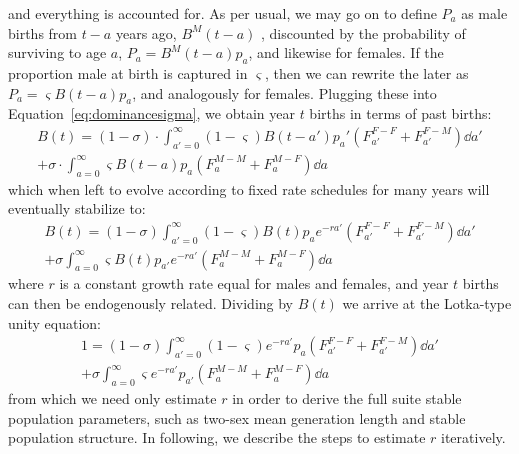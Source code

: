 and everything is accounted for. As per usual, we may go on to define $P_a$ as
male births from $t-a$ years ago, $B^M(t-a)$ , discounted by the probability of
surviving to age $a$, $P_a = B^M(t-a)p_a$, and likewise for females. If the
proportion male at birth is captured in $\varsigma$, then we can rewrite the
later as $P_a = \varsigma B(t-a)p_a$, and analogously for females. Plugging
these into Equation~\eqref{eq:dominancesigma}, we obtain year $t$ births in
terms of past births:
\begin{equation}
\label{eq:dominancebirths}
\begin{split}
B(t) = (1-\sigma) \cdot \int_{a'=0}^\infty (1-\varsigma) B(t-a')p_a'
(F_{a'}^{F-F}+F_{a'}^{F-M}) \dd a' \\
+ \sigma \cdot \int_{a=0}^\infty \varsigma B(t-a)p_a (F_a^{M-M}+F_a^{M-F}) \dd
a
\end{split}
\end{equation}
which when left to evolve according to fixed rate schedules for many years will
eventually stabilize to:
\begin{equation}
\label{eq:dominancebirthsstab}
\begin{split}
B(t) = (1-\sigma) \int_{a'=0}^\infty (1-\varsigma) B(t)p_ae^{-ra'}
(F_{a'}^{F-F}+F_{a'}^{F-M}) \dd a' \\
+ \sigma \int_{a=0}^\infty \varsigma B(t)p_{a'}e^{-ra'}
(F_a^{M-M}+F_a^{M-F}) \dd a
\end{split}
\end{equation}
where $r$ is a constant growth rate equal for males and females, and year $t$
births can then be endogenously related. Dividing by $B(t)$ we arrive at the
Lotka-type unity equation:
\begin{equation}
\label{eq:goodmanunity}
\begin{split}
1 = (1-\sigma) \int_{a'=0}^\infty (1-\varsigma) e^{-ra'}p_a
(F_{a'}^{F-F}+F_{a'}^{F-M}) \dd a' \\
+ \sigma \int_{a=0}^\infty \varsigma e^{-ra'}p_{a'} (F_a^{M-M}+F_a^{M-F})
\dd a
\end{split}
\end{equation}
from which we need only estimate $r$ in order to derive the full suite stable
population parameters, such as two-sex mean generation length and stable
population structure. In following, we describe the steps to estimate $r$
iteratively.

